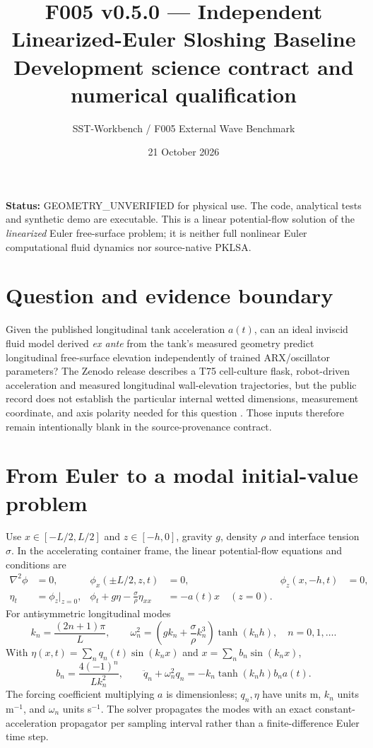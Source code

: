 \documentclass[11pt,a4paper]{article}
\title{\textbf{F005 v0.5.0 --- Independent Linearized-Euler Sloshing Baseline}\\[0.3em]
\large Development science contract and numerical qualification}
\author{SST-Workbench / F005 External Wave Benchmark}
\date{21 October 2026}
\newcommand{\status}[1]{\textsf{#1}}
\begin{document}
\maketitle
\noindent\textbf{Status:} \textcolor{red!70!black}{\status{GEOMETRY\_UNVERIFIED}} for physical use. The code, analytical tests and synthetic demo are executable. This is a linear potential-flow solution of the \emph{linearized} Euler free-surface problem; it is neither full nonlinear Euler computational fluid dynamics nor source-native PKLSA.

\section{Question and evidence boundary}
Given the published longitudinal tank acceleration $a(t)$, can an ideal inviscid fluid model derived \emph{ex ante} from the tank's measured geometry predict longitudinal free-surface elevation independently of trained ARX/oscillator parameters? The Zenodo release describes a T75 cell-culture flask, robot-driven acceleration and measured longitudinal wall-elevation trajectories, but the public record does not establish the particular internal wetted dimensions, measurement coordinate, and axis polarity needed for this question \cite{Giulietti2026}. Those inputs therefore remain intentionally blank in the source-provenance contract.

\section{From Euler to a modal initial-value problem}
Use $x\in[-L/2,L/2]$ and $z\in[-h,0]$, gravity $g$, density $\rho$ and interface tension $\sigma$. In the accelerating container frame, the linear potential-flow equations and conditions are
\begin{align}
\nabla^2\phi&=0,& \phi_x(\pm L/2,z,t)&=0, &\phi_z(x,-h,t)&=0,\\
\eta_t&=\phi_z\big|_{z=0},&
\phi_t+g\eta-\frac{\sigma}{\rho}\eta_{xx}&=-a(t)x\quad(z=0).
\end{align}
For antisymmetric longitudinal modes
\begin{equation}
k_n=\frac{(2n+1)\pi}{L},\qquad
\omega_n^2=\left(gk_n+\frac{\sigma}{\rho}k_n^3\right)\tanh(k_nh),\quad n=0,1,\ldots.
\end{equation}
With $\eta(x,t)=\sum_n q_n(t)\sin(k_nx)$ and $x=\sum_n b_n\sin(k_nx)$,
\begin{equation}
b_n=\frac{4(-1)^n}{L k_n^2},\qquad
\boxed{\ddot q_n+\omega_n^2q_n=-k_n\tanh(k_nh)b_n a(t).}
\end{equation}
The forcing coefficient multiplying $a$ is dimensionless; $q_n,\eta$ have units m, $k_n$ units m$^{-1}$, and $\omega_n$ units s$^{-1}$. The solver propagates the modes with an exact constant-acceleration propagator per sampling interval rather than a finite-difference Euler time step.
\end{document}

